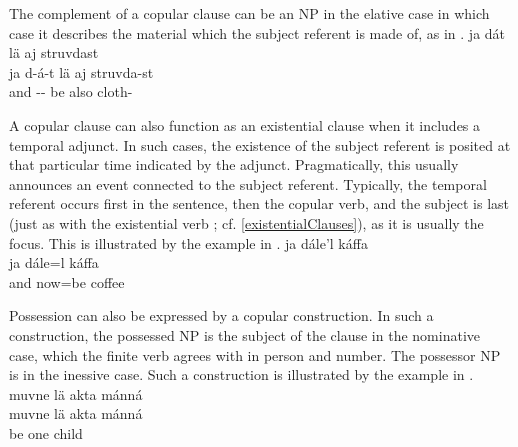 The complement of a copular clause can be an NP in the elative case in which case it describes the material which the subject referent is made of, as in .
\ea\label{copula5}
\glll	ja dát lä aj struvdast\\
	ja d-á-t lä aj struvda-st\\
	and -- be\BS{} also cloth-\\\nopagebreak
{} 
\z

A copular clause can also function as an existential clause when it includes a temporal adjunct. In such cases, the existence of the subject referent is posited at that particular time indicated by the adjunct. Pragmatically, this usually announces an event connected to the subject referent. Typically, the temporal referent occurs first in the sentence, then the copular verb, and the subject is last (just as with the existential verb ; cf. \SEC\ref{existentialClauses}), as it is usually the focus. 
This is illustrated by the example in .
\ea\label{copulaNr}
\glll	ja dále'l káffa\\
	ja dále=l káffa\\
	and now=be\BS{} coffee\BS{}\\\nopagebreak
{} 
\z

Possession can also be expressed by a copular construction. In such a construction, the possessed NP is the subject of the clause in the nominative case, which the finite verb agrees with in person and number. The possessor NP is in the inessive case. Such a construction is illustrated by the example in .
\ea\label{copula6}
\glll	muvne lä akta mánná\\
	muvne lä akta mánná\\
	 be\BS{} one child\BS{}\\\nopagebreak
{} 
\z

